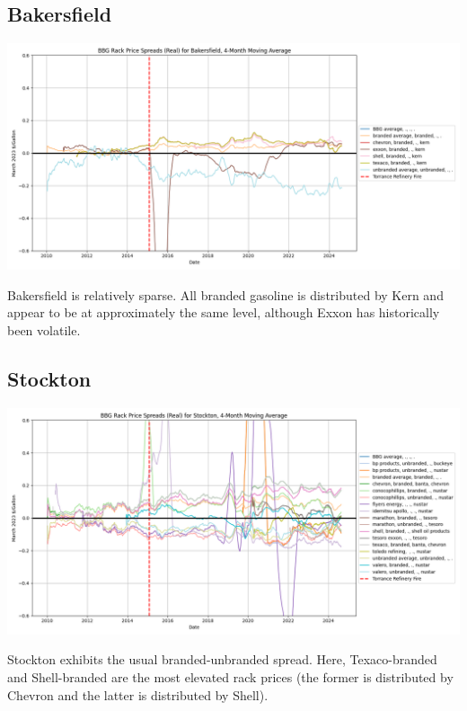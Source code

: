 \documentclass{article}
\begin{document}
\subsection{Bakersfield}
\centering \includegraphics[width=5.5in]{bakersfield_spread.png} \\
\raggedright Bakersfield is relatively sparse. All branded gasoline is distributed by Kern and appear to be at approximately the same level, although Exxon has historically been volatile.

\subsection{Stockton}
\centering \includegraphics[width=5.5in]{stockton_spread.png}\\
\raggedright Stockton exhibits the usual branded-unbranded spread. Here, Texaco-branded and Shell-branded are the most elevated rack prices (the former is distributed by Chevron and the latter is distributed by Shell). 
\end{document}
